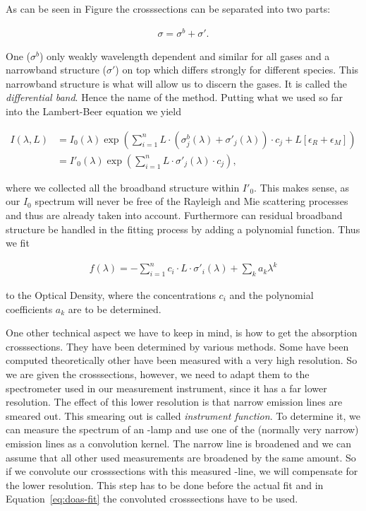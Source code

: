 As can be seen in Figure  the
crosssections can be separated into two parts: 

\begin{align*}
  \sigma = \sigma^b + \sigma'.
\end{align*}

One ($\sigma^b$) only weakly
wavelength dependent and similar for all gases and a narrowband
structure ($\sigma'$) on top which differs strongly for different species. This
narrowband structure is what will allow us to discern the gases. It is
called the \emph{differential band}. Hence the name of the
method. Putting what we used so far into the Lambert-Beer equation we
yield

\begin{align*}
  I(\lambda, L) & = I_0(\lambda) \exp \left ( \sum_{i=1}^n L \cdot
                  (\sigma^b_j(\lambda) + \sigma'_j(\lambda))\cdot c_j + L[\epsilon_R +
                  \epsilon_M]\right) \\
                & = I'_0(\lambda) \exp \left( \sum_{i=1}^n L \cdot
                  \sigma'_j(\lambda) \cdot c_j \right),
\end{align*}

where we collected all the broadband structure within $I'_0$. This
makes sense, as our $I_0$ spectrum will never be free of the Rayleigh
and Mie scattering processes and thus are already taken into
account. Furthermore can residual broadband structure be handled in
the fitting process by adding a polynomial function. Thus we fit

\begin{align}
  f(\lambda) = - \sum_{i=1}^n c_i \cdot L \cdot \sigma'_i(\lambda) +
  \sum_k a_k \lambda^k \label{eq:doas-fit}
\end{align}

to the Optical Density, where the concentrations $c_i$ and the polynomial
coefficients $a_k$ are to be determined. 

One other technical aspect we have to keep in mind, is how to get the
absorption crosssections. They have been determined by various
methods. Some have been computed theoretically other have been
measured with a very high resolution. So we are given the
crosssections, however, we need to adapt them to the spectrometer used
in our measurement instrument, since it has a far lower
resolution. The effect of this lower resolution is that narrow
emission lines are smeared out. This smearing out is called
\emph{instrument function}. To determine it, we can measure the
spectrum of an -lamp and use one of the
(normally very narrow) emission lines as a convolution kernel. The
narrow line is broadened and we can assume that all other used
measurements are broadened by the same amount. So if we convolute our
crosssections with this measured -line, we will compensate for
the lower resolution. This step has to be done before the actual fit
and in Equation~\eqref{eq:doas-fit} the convoluted crosssections have
to be used.

